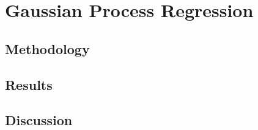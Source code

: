 \section{Gaussian Process Regression}

\subsection{Methodology}

\subsection{Results}

\subsection{Discussion}